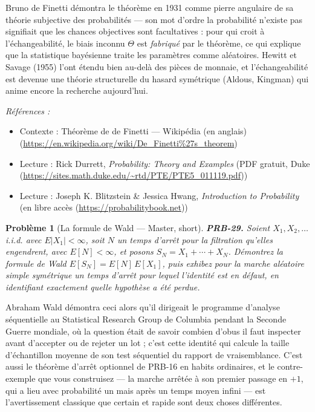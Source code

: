 \documentclass[11pt]{article}
\newtheorem{problem}{Problème}
\newenvironment{refs}{\par\small\noindent\emph{Références :}\begin{itemize}\setlength\itemsep{0pt}}{\end{itemize}\normalsize}
\begin{document}
\noindent Bruno de Finetti démontra le théorème en 1931 comme pierre angulaire de sa
théorie subjective des probabilités --- son mot d'ordre \og{} la probabilité n'existe pas \fg{} signifiait
que les chances objectives sont facultatives : pour qui croit à l'échangeabilité, le biais inconnu
$ \Theta $ est \textit{fabriqué} par le théorème, ce qui explique que la statistique bayésienne
traite les paramètres comme aléatoires. Hewitt et Savage (1955) l'ont étendu bien au-delà des
pièces de monnaie, et l'échangeabilité est devenue une théorie structurelle du hasard symétrique
(Aldous, Kingman) qui anime encore la recherche aujourd'hui.

\begin{refs}
\item Contexte : Théorème de de Finetti --- Wikipédia (en anglais) (\url{https://en.wikipedia.org/wiki/De_Finetti%27s_theorem})
\item Lecture : Rick Durrett, \textit{Probability: Theory and Examples} (PDF gratuit, Duke (\url{https://sites.math.duke.edu/~rtd/PTE/PTE5_011119.pdf}))
\item Lecture : Joseph K. Blitzstein \& Jessica Hwang, \textit{Introduction to Probability} (en libre accès (\url{https://probabilitybook.net}))
\end{refs}

\bigskip

\begin{problem}[{La formule de Wald --- Master, short}]
\textbf{PRB-29.} Soient $ X_1, X_2, \dots $ i.i.d. avec
$ E|X_1| < \infty $, soit $ N $ un temps d'arrêt pour la filtration qu'elles engendrent, avec
$ E[N] < \infty $, et posons $ S_N = X_1 + \cdots + X_N $. Démontrez la formule de Wald
$ E[S_N] = E[N]\, E[X_1] $, puis exhibez pour la marche aléatoire simple symétrique un temps
d'arrêt pour lequel l'identité est en défaut, en identifiant exactement quelle hypothèse a été
perdue.
\end{problem}

\noindent Abraham Wald démontra ceci alors qu'il dirigeait le programme d'analyse
séquentielle au Statistical Research Group de Columbia pendant la Seconde Guerre mondiale, où la
question était de savoir combien d'obus il faut inspecter avant d'accepter ou de rejeter un lot ;
c'est cette identité qui calcule la taille d'échantillon moyenne de son test séquentiel du rapport
de vraisemblance. C'est aussi le théorème d'arrêt optionnel de PRB-16 en habits ordinaires, et le
contre-exemple que vous construisez --- la marche arrêtée à son premier passage en $ +1 $, qui a
lieu avec probabilité un mais après un temps moyen infini --- est l'avertissement classique que
\og{} certain \fg{} et \og{} rapide \fg{} sont deux choses différentes.
\end{document}
